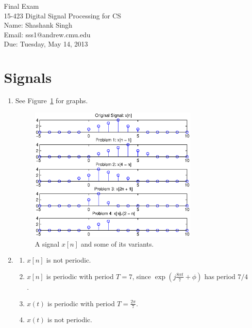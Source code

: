 \documentclass[11pt]{article}
\makeatletter
\newcommand{\myname}{Shashank Singh}
\newcommand{\myandrew}{sss1@andrew.cmu.edu}
\newcommand{\myclass}{15-423 Digital Signal Processing for CS}
\newcommand{\duedate}{Tuesday, May 14, 2013}
\makeatother
\begin{document}
\thispagestyle{plain}

{\Large Final Exam} \\
\myclass \\
Name: \myname \\
Email: \myandrew \\
Due: \duedate

\section{Signals}
\begin{enumerate}[1.]
\item See Figure~\ref{fig:1.1.1-4} for graphs.
\begin{figure}[h]
\begin{center}
\includegraphics[width=0.8\textwidth]{1.1.1-4.eps}
\end{center}
\vspace{-0.6in}
\caption{A signal $x[n]$ and some of its variants.}
\label{fig:1.1.1-4}
\end{figure}

\item
\begin{enumerate}[1.]
\item
$x[n]$ is not periodic.

\item
$x[n]$ is periodic with period $T = 7$, since
$\exp\left(j\frac{8\pi t}{7} + \phi \right)$ has period $7/4$.

\item
$x(t)$ is periodic with period $T = \frac{2\pi}{7}$.

\item
$x(t)$ is not periodic.

\end{enumerate}

\end{enumerate}
\end{document}
